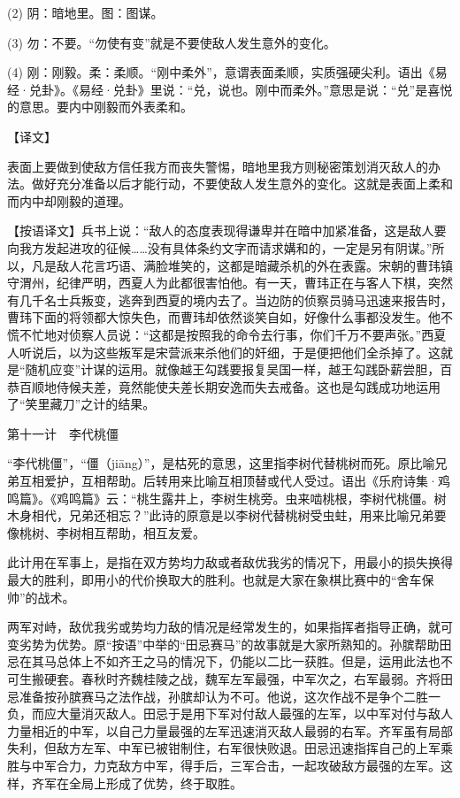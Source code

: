 \documentclass[12pt,UTF8]{ctexbook}
\begin{document}
(2) 阴：暗地里。图：图谋。

(3) 勿：不要。“勿使有变”就是不要使敌人发生意外的变化。

(4) 刚：刚毅。柔：柔顺。“刚中柔外”，意谓表面柔顺，实质强硬尖利。语出《易经·兑卦》。《易经·兑卦》里说：“兑，说也。刚中而柔外。”意思是说：“兑”是喜悦的意思。要内中刚毅而外表柔和。





【译文】


表面上要做到使敌方信任我方而丧失警惕，暗地里我方则秘密策划消灭敌人的办法。做好充分准备以后才能行动，不要使敌人发生意外的变化。这就是表面上柔和而内中却刚毅的道理。

【按语译文】兵书上说：“敌人的态度表现得谦卑并在暗中加紧准备，这是敌人要向我方发起进攻的征候……没有具体条约文字而请求媾和的，一定是另有阴谋。”所以，凡是敌人花言巧语、满脸堆笑的，这都是暗藏杀机的外在表露。宋朝的曹玮镇守渭州，纪律严明，西夏人为此都很害怕他。有一天，曹玮正在与客人下棋，突然有几千名士兵叛变，逃奔到西夏的境内去了。当边防的侦察员骑马迅速来报告时，曹玮下面的将领都大惊失色，而曹玮却依然谈笑自如，好像什么事都没发生。他不慌不忙地对侦察人员说：“这都是按照我的命令去行事，你们千万不要声张。”西夏人听说后，以为这些叛军是宋营派来杀他们的奸细，于是便把他们全杀掉了。这就是“随机应变”计谋的运用。就像越王勾践要报复吴国一样，越王勾践卧薪尝胆，百恭百顺地侍候夫差，竟然能使夫差长期安逸而失去戒备。这也是勾践成功地运用了“笑里藏刀”之计的结果。





第十一计　李代桃僵


“李代桃僵”，“僵（jiāng）”，是枯死的意思，这里指李树代替桃树而死。原比喻兄弟互相爱护，互相帮助。后转用来比喻互相顶替或代人受过。语出《乐府诗集·鸡鸣篇》。《鸡鸣篇》云：“桃生露井上，李树生桃旁。虫来啮桃根，李树代桃僵。树木身相代，兄弟还相忘？”此诗的原意是以李树代替桃树受虫蛀，用来比喻兄弟要像桃树、李树相互帮助，相互友爱。

此计用在军事上，是指在双方势均力敌或者敌优我劣的情况下，用最小的损失换得最大的胜利，即用小的代价换取大的胜利。也就是大家在象棋比赛中的“舍车保帅”的战术。

两军对峙，敌优我劣或势均力敌的情况是经常发生的，如果指挥者指导正确，就可变劣势为优势。原“按语”中举的“田忌赛马”的故事就是大家所熟知的。孙膑帮助田忌在其马总体上不如齐王之马的情况下，仍能以二比一获胜。但是，运用此法也不可生搬硬套。春秋时齐魏桂陵之战，魏军左军最强，中军次之，右军最弱。齐将田忌准备按孙膑赛马之法作战，孙膑却认为不可。他说，这次作战不是争个二胜一负，而应大量消灭敌人。田忌于是用下军对付敌人最强的左军，以中军对付与敌人力量相近的中军，以自己力量最强的左军迅速消灭敌人最弱的右军。齐军虽有局部失利，但敌方左军、中军已被钳制住，右军很快败退。田忌迅速指挥自己的上军乘胜与中军合力，力克敌方中军，得手后，三军合击，一起攻破敌方最强的左军。这样，齐军在全局上形成了优势，终于取胜。
\end{document}
